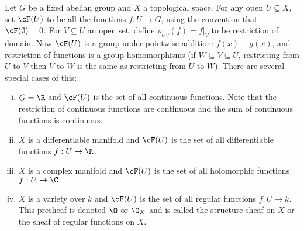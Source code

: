 \begin{ex}
Let $G$ be a fixed abelian group and $X$ a topological space. For any open $U \subseteq X$, set $\cF(U)$ to be all the functions $f: U \to G$, using the convention that $\cF(\emptyset)= 0$. For $V \subseteq U$ an open set, define $\rho_{UV}(f)= f\big|_V$ to be restriction of domain. Now $\cF(U)$ is a group under pointwise addition: $f(x)+g(x)$, and restriction of functions is a group homomorphisms (if $W \subseteq V \subseteq U$, restricting from $U$ to $V$ then $V$ to $W$ is the same as restricting from $U$ to $W$). There are several special cases of this: 
	\begin{enumerate}[(i)]
	\item $G= \R$ and $\cF(U)$ is the set of all continuous functions. Note that the restriction of continuous functions are continuous and the sum of continuous functions is continuous. 
	\item $X$ is a differentiable manifold and $\cF(U)$ is the set of all differentiable functions $f: U \to \R$.
	\item $X$ is a complex manifold and $\cF(U)$ is the set of all holomorphic functions $f: U \to \C$
	\item $X$ is a variety over $k$ and $\cF(U)$ is the set of all regular functions $f: U \to k$. This presheaf is denoted $\O$ or $\O_X$ and is called the structure sheaf on $X$ or the sheaf of regular functions on $X$.
	\end{enumerate}
\end{ex}


